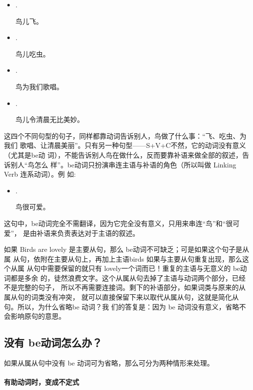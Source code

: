 \begin{itemize}
\item {} .

  鸟儿飞。
\item {}  .

  鸟儿吃虫。
\item {}   .

  鸟为我们歌唱。
\item {}   .

  鸟儿令清晨无比美妙。
\end{itemize}
这四个不同句型的句子，同样都靠动词告诉别人，鸟做了什么事：“飞、吃虫、为我们
歌唱、让清晨美丽”。只有另一种句型——S+V+C不然，它的动词没有意义（尤其是be动
词），不能告诉别人鸟在做什么，反而要靠补语来做全部的叙述，告诉别人“鸟怎么
样”。be动词只扮演串连主语与补语的角色（所以叫做 Linking Verb 连系动词）。例
如:
\begin{itemize}
\item {}  .

  鸟很可爱。
\end{itemize}
这句中，be动词完全不需翻译，因为它完全没有意义，只用来串连“鸟”和“很可爱”，
是由补语来负责表达对于主语的叙述。

如果 Birds are lovely 是主要从句，那么 be动词不可缺乏；可是如果这个句子是从属
从句，依附在主要从句上，再加上主语birds 如果与主要从句重复出现，那么这个从属
从句中需要保留的就只有 lovely一个词而已！重复的主语与无意义的 be动词都是多余
的，徒然浪费文字。这个从属从句去掉了主语与动词两个部分，已经不是完整的句子，
所以不再需要连接词。剩下的补语部分，如果词类与原来的从属从句的词类没有冲突，
就可以直接保留下来以取代从属从句，这就是简化从句。所以，为什么省略be 动词？我
们的答复是：因为 be 动词没有意义，省略不会影响原句的意思。

\subsection{没有 be动词怎么办？}

如果从属从句中没有 be 动词可为省略，那么可分为两种情形来处理。

\paragraph{有助动词时，变成不定式}

